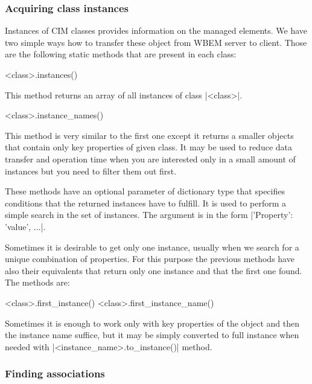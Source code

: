 \subsubsection{Acquiring class instances}
\label{openlmi:shell:examples:instances}

Instances of CIM classes provides information on the managed elements. We have
two simple ways how to transfer these object from WBEM server to client. Those
are the following static methods that are present in each class:

\begin{funcproto}
<class>.instances()
\end{funcproto}
\begin{funcdesc}
This method returns an array of all instances of class |<class>|.
\end{funcdesc}

\begin{funcproto}
<class>.instance_names() 
\end{funcproto}
\begin{funcdesc}
This method is very similar to the first one except it returns a smaller objects
that contain only key properties of given class. It may be used to reduce
data transfer and operation time when you are interested only in a small
amount of instances but you need to filter them out first.
\end{funcdesc}
\funclistend
These methods have an optional parameter of dictionary type that specifies
conditions that the returned instances have to fulfill. It is used to perform
a simple search in the set of instances. The argument is in the form
|{'Property': 'value', ...}|.

Sometimes it is desirable to get only one instance, usually when we search for a
unique combination of properties. For this purpose the previous methods have
also their equivalents that return only one instance and that the first one
found. The methods are:

\begin{funcproto}
<class>.first_instance()
<class>.first_instance_name() 
\end{funcproto}
\funclistend
Sometimes it is enough to work only with key properties of the object and then
the instance name suffice, but it may be simply converted to full instance when
needed with |<instance_name>.to_instance()| method.

\subsubsection{Finding associations}
\label{openlmi:shell:examples:associations}


